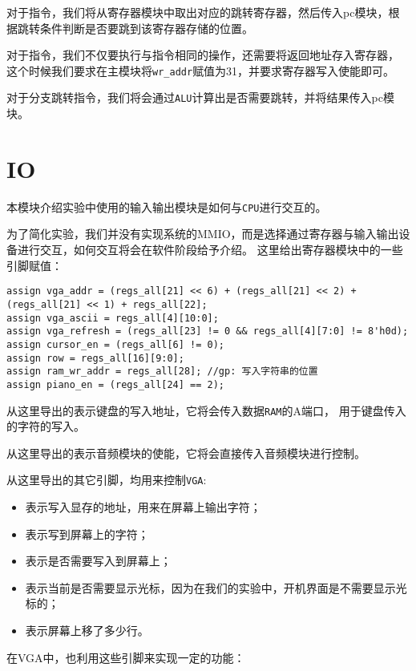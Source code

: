 \kaishu
对于指令，我们将从寄存器模块中取出对应的跳转寄存器，然后传入pc模块，根据跳转条件判断是否要跳到该寄存器存储的位置。

对于指令，我们不仅要执行与指令相同的操作，还需要将返回地址存入寄存器，
这个时候我们要求在主模块将\texttt{wr\_addr}赋值为31，并要求寄存器写入使能即可。

对于分支跳转指令，我们将会通过\texttt{ALU}计算出是否需要跳转，并将结果传入pc模块。

\section{IO}
\songti
\hspace*{9mm}本模块介绍实验中使用的输入输出模块是如何与\texttt{CPU}进行交互的。

为了简化实验，我们并没有实现系统的MMIO，而是选择通过寄存器与输入输出设备进行交互，如何交互将会在软件阶段给予介绍。
这里给出寄存器模块中的一些引脚赋值：
\begin{lstlisting}[style = verilog-style, caption = {寄存器与IO交互}]
assign vga_addr = (regs_all[21] << 6) + (regs_all[21] << 2) + (regs_all[21] << 1) + regs_all[22];
assign vga_ascii = regs_all[4][10:0];
assign vga_refresh = (regs_all[23] != 0 && regs_all[4][7:0] != 8'h0d);
assign cursor_en = (regs_all[6] != 0);
assign row = regs_all[16][9:0];
assign ram_wr_addr = regs_all[28]; //gp: 写入字符串的位置
assign piano_en = (regs_all[24] == 2);
\end{lstlisting}

从这里导出的表示键盘的写入地址，它将会传入数据\texttt{RAM}的A端口，
用于键盘传入的字符的写入。

从这里导出的表示音频模块的使能，它将会直接传入音频模块进行控制。

从这里导出的其它引脚，均用来控制\texttt{VGA}:
\begin{itemize}
	\item {}表示写入显存的地址，用来在屏幕上输出字符；
	\item {}表示写到屏幕上的字符；
	\item {}表示是否需要写入到屏幕上；
	\item {}表示当前是否需要显示光标，因为在我们的实验中，开机界面是不需要显示光标的；
	\item {}表示屏幕上移了多少行。
\end{itemize}

在VGA中，也利用这些引脚来实现一定的功能：

